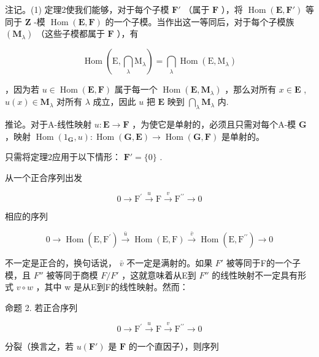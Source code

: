 注记。(1) 定理2使我们能够，对于每个子模 \(\mathbf{F}'\) （属于 \(\mathbf{F}\) ），将 \(\operatorname{Hom}(\mathbf{E}, \mathbf{F}')\) 等同于 \(\mathbf{Z}\) -模 \(\operatorname{Hom}(\mathbf{E}, \mathbf{F})\) 的一个子模。当作出这一等同后，对于每个子模族 \((\mathbf{M}_{\lambda})\) （这些子模都属于 \(\mathbf{F}\) ），有

\[
\operatorname{Hom} \left(\mathrm{E}, \bigcap_ {\lambda} \mathrm{M} _ {\lambda}\right) = \bigcap_ {\lambda} \operatorname{Hom} (\mathrm{E}, \mathrm{M} _ {\lambda})
\]

，因为若 \(u \in \operatorname{Hom}(\mathbf{E}, \mathbf{F})\) 属于每一个 \(\operatorname{Hom}(\mathbf{E}, \mathbf{M}_{\lambda})\) ，那么对所有 \(x \in \mathbf{E}\) , \(u(x) \in \mathbf{M}_{\lambda}\) 对所有 \(\lambda\) 成立，因此 \(u\) 把 \(\mathbf{E}\) 映到 \(\bigcap_{\lambda} \mathbf{M}_{\lambda}\) 内.

推论。对于A-线性映射 \(u: \mathbf{E} \to \mathbf{F}\) ，为使它是单射的，必须且只需对每个A-模 \(\mathbf{G}\) ，映射 \(\operatorname{Hom}(1_{\mathbf{G}}, u): \operatorname{Hom}(\mathbf{G}, \mathbf{E}) \to \operatorname{Hom}(\mathbf{G}, \mathbf{F})\) 是单射的。

只需将定理2应用于以下情形： \(\mathbf{F}' = \{0\}\) .

从一个正合序列出发

\[
0 \longrightarrow \mathrm{F} ^ {\prime} \stackrel {u} {\longrightarrow} \mathrm{F} \stackrel {v} {\longrightarrow} \mathrm{F} ^ {\prime \prime} \longrightarrow 0
\]

相应的序列

\[
0 \longrightarrow \operatorname{Hom} (\mathrm{E}, \mathrm{F} ^ {\prime}) \stackrel {\bar {u}} {\longrightarrow} \operatorname{Hom} (\mathrm{E}, \mathrm{F}) \stackrel {\bar {v}} {\longrightarrow} \operatorname{Hom} (\mathrm{E}, \mathrm{F} ^ {\prime \prime}) \longrightarrow 0
\]

不一定是正合的，换句话说， \(\bar{v}\) 不一定是满射的。如果 \(F'\) 被等同于F的一个子模，且 \(F''\) 被等同于商模 \(F/F'\) ，这就意味着从E到 \(F''\) 的线性映射不一定具有形式 \(v \circ w\) ，其中 w 是从E到F的线性映射。然而：

命题 2. 若正合序列

\[
0 \longrightarrow \mathrm{F} ^ {\prime} \stackrel {u} {\longrightarrow} \mathrm{F} \stackrel {v} {\longrightarrow} \mathrm{F} ^ {\prime \prime} \longrightarrow 0\tag{7}
\]

分裂（换言之，若 \(u(\mathbf{F}')\) 是 \(\mathbf{F}\) 的一个直因子），则序列

